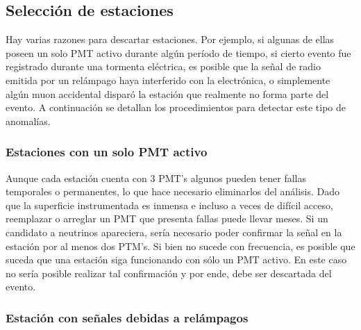 	\subsection{Selección de estaciones}
	
	Hay varias razones para descartar estaciones. Por ejemplo, si algunas de ellas poseen un solo PMT activo durante algún período de tiempo, si cierto evento fue registrado durante una tormenta eléctrica, es posible que la señal de radio emitida por un relámpago haya interferido con la electrónica, o simplemente algún muon accidental disparó la estación que realmente no forma parte del evento.
	A continuación se detallan los procedimientos para detectar este tipo de anomal\'ias.
	
		\subsubsection{Estaciones con un solo PMT activo}
		
		Aunque cada estación cuenta con 3 PMT's algunos pueden tener fallas temporales o permanentes, lo que hace necesario eliminarlos del análisis.
		Dado que la superficie instrumentada es inmensa e incluso a veces de dif\'icil acceso, reemplazar o arreglar un PMT que presenta fallas puede llevar meses.
		Si un candidato a neutrinos apareciera, ser\'ia necesario poder confirmar la señal en la estación por al menos dos PTM's. 
		Si bien no sucede con frecuencia, es posible que suceda que una estación siga funcionando con s\'olo un PMT activo.
		En este caso no sería posible realizar tal confirmación y por ende, debe ser descartada del evento.
		
		\subsubsection{Estación con señales debidas a relámpagos}
		
